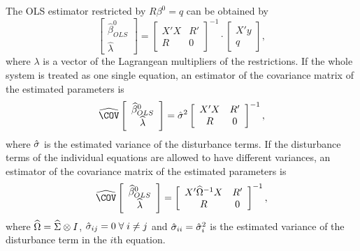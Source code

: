 The OLS estimator restricted by $R \beta^0 = q$ can be obtained by
\begin{equation}
   \left[ \begin{array}{c}
      \widehat{\beta}^0_{OLS} \\ \widehat{\lambda}
   \end{array} \right]
   =
   \left[ \begin{array}{cc}
      X' X & R' \\ 
      R & 0
   \end{array} \right]^{-1}
   \cdot
   \left[ \begin{array}{c}
      X' y \\ q 
   \end{array} \right] ,
\end{equation}
where $\lambda$ is a vector of the Lagrangean multipliers of the restrictions.
If the whole system is treated as one single equation,
an estimator of the covariance matrix of the estimated parameters is
\begin{equation}
   \COVHat
   \left[ \begin{array}{c}
      \widehat{\beta}^0_{OLS} \\ \widehat{\lambda}
   \end{array} \right] 
   = \sHat^2 
   \left[ \begin{array}{cc}
      X' X & R' \\ 
      R & 0
   \end{array} \right]^{-1} ,
\end{equation}
where $\hat{\sigma}$ is the estimated variance of the disturbance terms.
If the disturbance terms of the individual equations
are allowed to have different variances, 
an estimator of the covariance matrix of the estimated parameters is
\begin{equation}
   \COVHat
   \left[ \begin{array}{c}
      \widehat{\beta}^0_{OLS} \\ \widehat{\lambda}
   \end{array} \right] 
   = 
   \left[ \begin{array}{cc}
      X' \OHat^{-1} X & R' \\
      R & 0
   \end{array} \right]^{-1} ,
\end{equation}
where $\widehat{\Omega} = \widehat{\Sigma} \otimes I$,
$\hat{\sigma}_{ij} = 0 \; \forall \; i \neq j$ and
$\hat{\sigma}_{ii} = \hat{\sigma}_i^2$ is the estimated variance
of the disturbance term in the $i$th equation.


